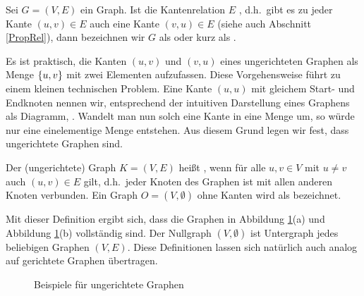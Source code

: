 \begin{definition}
Sei $G=(V,E)$ ein Graph. Ist die Kantenrelation
$E$ , d.h.~gibt es zu jeder Kante $(u,v) \in E$
auch eine Kante $(v,u) \in E$ (siehe auch Abschnitt \ref{PropRel}),
dann bezeichnen wir $G$ als  oder kurz als .
\end{definition}

Es ist praktisch, die Kanten $(u,v)$ und $(v,u)$ eines ungerichteten
Graphen als Menge $\{u,v\}$ mit zwei Elementen aufzufassen. Diese
Vorgehensweise führt zu einem kleinen technischen Problem. Eine Kante
$(u,u)$ mit gleichem Start- und Endknoten nennen wir, entsprechend der
intuitiven Darstellung eines Graphens als Diagramm, .
Wandelt man nun solch eine Kante in eine Menge um, so würde nur eine
einelementige Menge entstehen. Aus diesem Grund legen wir fest, dass
ungerichtete Graphen  sind.

\begin{definition}
Der (ungerichtete) Graph $K = (V,E)$ heißt , wenn
für alle $u,v \in V$ mit $u \neq v$ auch $(u,v) \in E$ gilt,
d.h.~jeder Knoten des Graphen ist mit allen anderen Knoten
verbunden. Ein Graph $O=(V,\emptyset)$ ohne Kanten wird
als  bezeichnet.
\end{definition}
Mit dieser Definition ergibt sich, dass die Graphen in
Abbildung \ref{ugGraphen}(a) und Abbildung \ref{ugGraphen}(b)
vollständig sind. Der Nullgraph $(V,\emptyset)$ ist Untergraph jedes
beliebigen Graphen $(V,E)$. Diese Definitionen lassen sich natürlich
auch analog auf gerichtete Graphen übertragen.

\begin{figure}
\centering
{}
\hfill
{}
\hfill
{}
\caption{Beispiele für ungerichtete Graphen}
\label{ugGraphen}
\end{figure}

